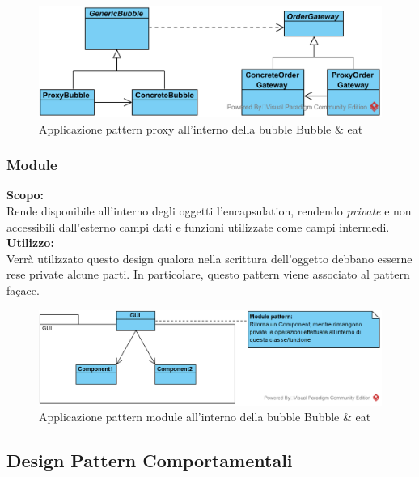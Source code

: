 \begin{figure}[H]
	\centering
	\includegraphics[width=15cm]{./diagrammi_img/applicazione_pattern/proxy_demo.png}
	\caption{Applicazione pattern proxy all'interno della bubble Bubble \& eat}
\end{figure}

\subsubsection{Module}
\textbf{Scopo:} \\
Rende disponibile all'interno degli oggetti l'encapsulation, rendendo \textit{private} e non accessibili dall'esterno campi dati e funzioni utilizzate come campi intermedi.\\
\textbf{Utilizzo:} \\
Verrà utilizzato questo design qualora nella scrittura dell'oggetto debbano esserne rese private alcune parti. In particolare, questo pattern viene associato al pattern fa\c{c}ace.
\begin{figure}[H]
	\centering
	\includegraphics[width=15cm]{./diagrammi_img/applicazione_pattern/module_framework.png}
	\caption{Applicazione pattern module all'interno della bubble Bubble \& eat}
\end{figure}

\subsection{Design Pattern Comportamentali}

